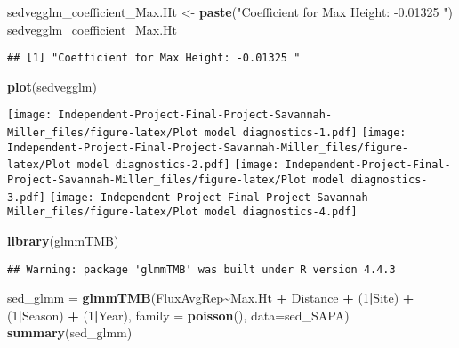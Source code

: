 \documentclass[
]{article}
\newenvironment{Shaded}{\begin{snugshade}}{\end{snugshade}}
\newcommand{\AttributeTok}[1]{\textcolor[rgb]{0.13,0.29,0.53}{#1}}
\newcommand{\DecValTok}[1]{\textcolor[rgb]{0.00,0.00,0.81}{#1}}
\newcommand{\FunctionTok}[1]{\textcolor[rgb]{0.13,0.29,0.53}{\textbf{#1}}}
\newcommand{\NormalTok}[1]{#1}
\newcommand{\OtherTok}[1]{\textcolor[rgb]{0.56,0.35,0.01}{#1}}
\newcommand{\SpecialCharTok}[1]{\textcolor[rgb]{0.81,0.36,0.00}{\textbf{#1}}}
\newcommand{\StringTok}[1]{\textcolor[rgb]{0.31,0.60,0.02}{#1}}
\begin{document}
\begin{Shaded}
\begin{Highlighting}[]
\NormalTok{sedvegglm\_coefficient\_Max.Ht }\OtherTok{\textless{}{-}} \FunctionTok{paste}\NormalTok{(}\StringTok{"Coefficient for Max Height: {-}0.01325 "}\NormalTok{)}
\NormalTok{sedvegglm\_coefficient\_Max.Ht}
\end{Highlighting}
\end{Shaded}

\begin{verbatim}
## [1] "Coefficient for Max Height: -0.01325 "
\end{verbatim}

\begin{Shaded}
\begin{Highlighting}[]
\FunctionTok{plot}\NormalTok{(sedvegglm)}
\end{Highlighting}
\end{Shaded}

\texttt{[image: Independent-Project-Final-Project-Savannah-Miller\_files/figure-latex/Plot model diagnostics-1.pdf]}
\texttt{[image: Independent-Project-Final-Project-Savannah-Miller\_files/figure-latex/Plot model diagnostics-2.pdf]}
\texttt{[image: Independent-Project-Final-Project-Savannah-Miller\_files/figure-latex/Plot model diagnostics-3.pdf]}
\texttt{[image: Independent-Project-Final-Project-Savannah-Miller\_files/figure-latex/Plot model diagnostics-4.pdf]}

\begin{Shaded}
\begin{Highlighting}[]
\FunctionTok{library}\NormalTok{(glmmTMB)}
\end{Highlighting}
\end{Shaded}

\begin{verbatim}
## Warning: package 'glmmTMB' was built under R version 4.4.3
\end{verbatim}

\begin{Shaded}
\begin{Highlighting}[]
\NormalTok{sed\_glmm }\OtherTok{=} \FunctionTok{glmmTMB}\NormalTok{(FluxAvgRep}\SpecialCharTok{\textasciitilde{}}\NormalTok{Max.Ht }\SpecialCharTok{+}\NormalTok{ Distance }\SpecialCharTok{+}\NormalTok{ (}\DecValTok{1}\SpecialCharTok{|}\NormalTok{Site) }\SpecialCharTok{+}\NormalTok{ (}\DecValTok{1}\SpecialCharTok{|}\NormalTok{Season) }\SpecialCharTok{+}\NormalTok{ (}\DecValTok{1}\SpecialCharTok{|}\NormalTok{Year), }\AttributeTok{family =} \FunctionTok{poisson}\NormalTok{(), }\AttributeTok{data=}\NormalTok{sed\_SAPA)}
\FunctionTok{summary}\NormalTok{(sed\_glmm)}
\end{Highlighting}
\end{Shaded}
\end{document}
